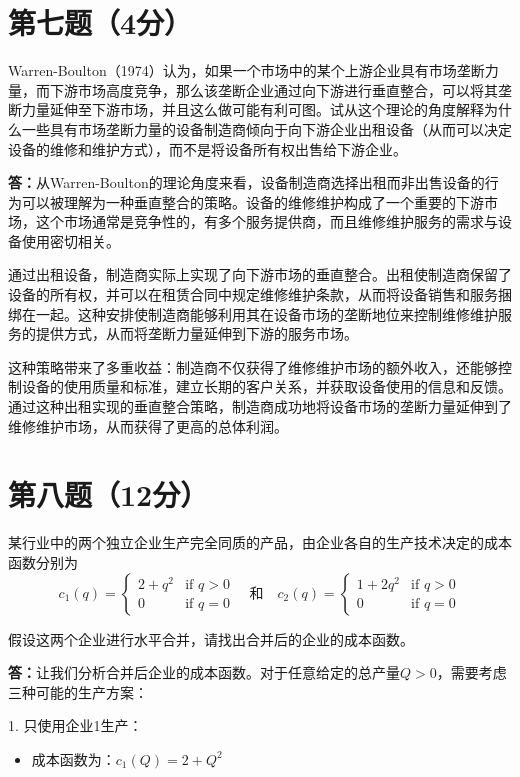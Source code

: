 \documentclass[12pt]{article}
\begin{document}
\section*{第七题（4分）}
Warren-Boulton（1974）认为，如果一个市场中的某个上游企业具有市场垄断力量，而下游市场高度竞争，那么该垄断企业通过向下游进行垂直整合，可以将其垄断力量延伸至下游市场，并且这么做可能有利可图。试从这个理论的角度解释为什么一些具有市场垄断力量的设备制造商倾向于向下游企业出租设备（从而可以决定设备的维修和维护方式），而不是将设备所有权出售给下游企业。

\noindent\textbf{答：}从Warren-Boulton的理论角度来看，设备制造商选择出租而非出售设备的行为可以被理解为一种垂直整合的策略。设备的维修维护构成了一个重要的下游市场，这个市场通常是竞争性的，有多个服务提供商，而且维修维护服务的需求与设备使用密切相关。

通过出租设备，制造商实际上实现了向下游市场的垂直整合。出租使制造商保留了设备的所有权，并可以在租赁合同中规定维修维护条款，从而将设备销售和服务捆绑在一起。这种安排使制造商能够利用其在设备市场的垄断地位来控制维修维护服务的提供方式，从而将垄断力量延伸到下游的服务市场。

这种策略带来了多重收益：制造商不仅获得了维修维护市场的额外收入，还能够控制设备的使用质量和标准，建立长期的客户关系，并获取设备使用的信息和反馈。通过这种出租实现的垂直整合策略，制造商成功地将设备市场的垄断力量延伸到了维修维护市场，从而获得了更高的总体利润。

\section*{第八题（12分）}
某行业中的两个独立企业生产完全同质的产品，由企业各自的生产技术决定的成本函数分别为
\[c_1(q)=\begin{cases}2+q^2 & \text{if }q>0 \\ 0 & \text{if }q=0\end{cases}\quad\text{和}\quad c_2(q)=\begin{cases}1+2q^2 & \text{if }q>0 \\ 0 & \text{if }q=0\end{cases}\]

假设这两个企业进行水平合并，请找出合并后的企业的成本函数。

\noindent\textbf{答：}让我们分析合并后企业的成本函数。对于任意给定的总产量$Q>0$，需要考虑三种可能的生产方案：

1. 只使用企业1生产：
\begin{itemize}
\item 成本函数为：$c_1(Q)=2+Q^2$
\end{itemize}
\end{document}
